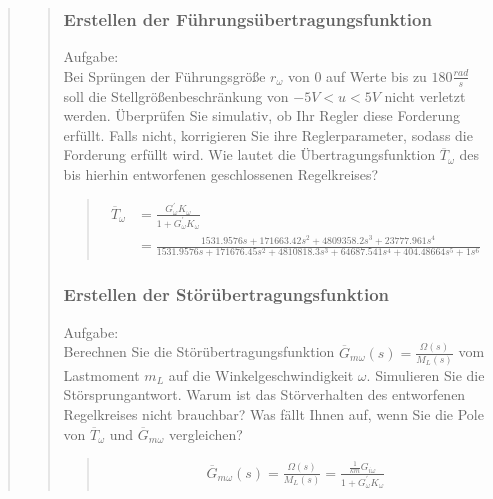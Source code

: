 \begin{quote}
\begin{quote}
        
        
        \subsubsection{Erstellen der Führungsübertragungsfunktion}
        \label{2d}
        Aufgabe:\\
        Bei Sprüngen der Führungsgröße $r_\omega$ von $0$ auf Werte bis zu $180 \frac{rad}{s}$ soll die
        Stellgrößenbeschränkung von $−5V < u < 5V$ nicht verletzt werden. Überprüfen Sie simulativ, ob Ihr Regler
        diese Forderung erfüllt. Falls nicht, korrigieren Sie ihre Reglerparameter, sodass die Forderung erfüllt wird.
        Wie lautet die Übertragungsfunktion $\overline{T}_\omega$ des bis hierhin entworfenen geschlossenen
        Regelkreises?
        \begin{quote}
            
            \begin{equation*}
            	\begin{split}
            		\overline{T}_\omega &= \frac{G_\omega^{'} K_\omega}{1 + G_\omega^{'} K_\omega}\\
            		&= \frac{1531.9576s +  171663.42s^2 +  4809358.2s^3 +  23777.961s^4}{1531.9576s +  171676.45s^2 + 
            		4810818.3s^3 +  64687.541s^4 +  404.48664s^5 +  1s^6}
            	\end{split}
            \end{equation*}
        \end{quote}
        
        \subsubsection{Erstellen der Störübertragungsfunktion}
        \label{2e}
        Aufgabe:\\
        Berechnen Sie die Störübertragungsfunktion $\overline{G}_{m\omega} (s) = \frac{\Omega(s)}{M_L (s)}$ vom
        Lastmoment $m_L$ auf die Winkelgeschwindigkeit $\omega$. Simulieren Sie die Störsprungantwort. Warum ist das
        Störverhalten des entworfenen Regelkreises nicht brauchbar? Was fällt Ihnen auf, wenn Sie die Pole von
        $\overline{T}_\omega$ und $\overline{G}_{m\omega}$ vergleichen?
		\begin{quote}
			\begin{equation*}
            	\begin{split}
            		\overline{G}_{m\omega} (s) = \frac{\Omega(s)}{M_L (s)} = \frac{\frac{1}{km}G_{i\omega}}{1+ G_\omega^{'}
            		K_\omega}
            	\end{split}
            \end{equation*}
            

\end{quote}
\end{quote}
\end{quote}
